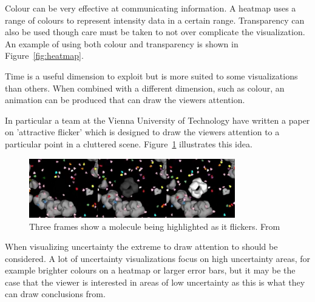Colour can be very effective at communicating information. A heatmap uses a range of colours to represent intensity data in a certain range. Transparency can also be used though care must be taken to not over complicate the visualization. An example of using both colour and transparency is shown in Figure~\ref{fig:heatmap}.

Time is a useful dimension to exploit but is more suited to some visualizations than others. When combined with a different dimension, such as colour, an animation can be produced that can draw the viewers attention.

In particular a team at the Vienna University of Technology have written a paper on 'attractive flicker' which is designed to draw the viewers attention to a particular point in a cluttered scene\cite{attractiveflicker}. Figure~\ref{fig:flicker} illustrates this idea.

\begin{figure}[H]
    \centering
	\includegraphics[width=0.8\textwidth]{images/background/flicker.png}
    \caption{Three frames show a molecule being highlighted as it flickers. From \cite{attractiveflicker}}
    \label{fig:flicker}
\end{figure}

When visualizing uncertainty the extreme to draw attention to should be considered. A lot of uncertainty visualizations focus on high uncertainty areas, for example brighter colours on a heatmap or larger error bars, but it may be the case that the viewer is interested in areas of low uncertainty as this is what they can draw conclusions from.